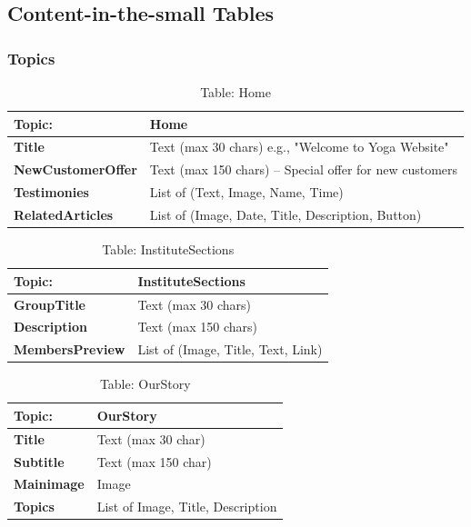 \subsection{Content-in-the-small Tables}

\subsubsection{Topics}

\begin{table}[H]
\centering
\begin{tabularx}{\textwidth}{|>{\bfseries}l|X|}
\hline
Topic: & \textbf{Home} \\
\hline
Title & Text (max 30 chars) e.g., "Welcome to Yoga Website" \\
\hline
NewCustomerOffer & Text (max 150 chars) – Special offer for new customers \\
\hline
Testimonies & List of (Text, Image, Name, Time) \\
\hline
RelatedArticles & List of (Image, Date, Title, Description, Button) \\
\hline
\end{tabularx}
\caption{Table: Home}
\end{table}


\begin{table}[H]
\centering
\begin{tabularx}{\textwidth}{|>{\bfseries}l|X|}
\hline
Topic: & \textbf{InstituteSections} \\
\hline
GroupTitle & Text (max 30 chars) \\
\hline
Description & Text (max 150 chars) \\
\hline
MembersPreview & List of (Image, Title, Text, Link) \\
\hline
\end{tabularx}
\caption{Table: InstituteSections}
\end{table}

\begin{table}[H]
\centering
\begin{tabularx}{\textwidth}{|>{\bfseries}l|X|}
\hline
Topic: & \textbf{OurStory} \\
\hline
Title & Text (max 30 char) \\
\hline
Subtitle & Text (max 150 char) \\
\hline
Mainimage & Image \\
\hline
Topics & List of {Image, Title, Description} \\
\hline
\end{tabularx}
\caption{Table: OurStory}
\end{table}


